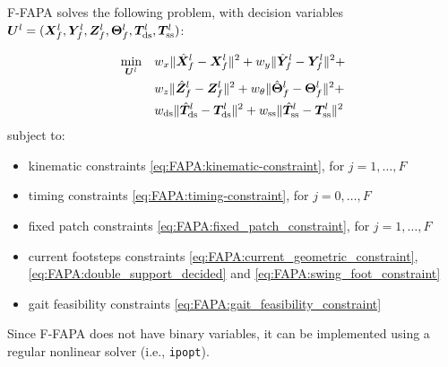 F-FAPA solves the following problem, with decision variables  ${\bm{U}}^l = (\bm{X}_f^l, \bm{Y}_f^l, \bm{Z}_f^l, \bm{\Theta}_f^l, \bm{T}_{\rm ds}^l, \bm{T}_{\rm ss}^l)$:
\begin{braced}
\begin{equation*}\begin{split}
\min_{{\bm{U}}^l}\quad
& w_x \| \hat{\bm{X}}_f^l - \bm{X}_f^l \|^2 + w_y \| \hat{\bm{Y}}_f^l - \bm{Y}_f^l \|^2 + \\& w_z \| \hat{\bm{Z}}_f^l - \bm{Z}_f^l \|^2 + w_{\theta} \| \hat{\bm{\Theta}}_f^l - \bm{\Theta}_f^l \|^2 + \\& w_{\rm ds} \| \hat{\bm{T}}_{\rm ds}^l - \bm{T}_{\rm ds}^l \|^2 + w_{\rm ss} \| \hat{\bm{T}}_{\rm ss}^l - \bm{T}_{\rm ss}^l \|^2
\end{split}\end{equation*}
\hspace{0.25cm} subject to:
\begin{itemize}
\item kinematic constraints \eqref{eq:FAPA:kinematic-constraint}, for $j=1,\dots,F$
\item timing constraints \eqref{eq:FAPA:timing-constraint}, for $j=0,\dots,F$
\item fixed patch constraints \eqref{eq:FAPA:fixed_patch_constraint}, for $j=1,\dots,F$
\item current footsteps constraints \eqref{eq:FAPA:current_geometric_constraint}, \eqref{eq:FAPA:double_support_decided} and \eqref{eq:FAPA:swing_foot_constraint}
\item gait feasibility constraints \eqref{eq:FAPA:gait_feasibility_constraint}
\end{itemize}
\end{braced}

\medskip

Since F-FAPA does not have binary variables, it can be implemented using a regular nonlinear solver (i.e., \texttt{ipopt}).

